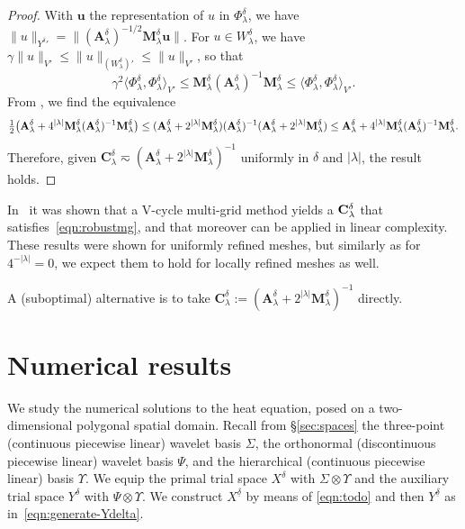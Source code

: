 \documentclass[11pt,a4paper,oneside,english]{amsart}
\numberwithin{equation}{section}
\numberwithin{theorem}{section}
\theoremstyle{definition}
\newcommand{\la}{\langle}
\newcommand{\ra}{\rangle}
\newcommand{\udelta}{{\underline{\delta}}}
\newcommand{\rvv}[1]{{\color{teal}{RvV: #1}}}
\begin{document}
\begin{proof}

  With $\mathbf u$ the representation of $u$ in $\Phi_\lambda^\delta$, we have
  $\|u\|_{{Y^\delta}'} = \|(\mathbf A_\lambda^\delta)^{-1/2} \mathbf M_\lambda^\delta \mathbf u\|$.
For $u \in W_\lambda^\delta$, we have $\gamma \|u\|_{V'} \leq \|u\|_{(W_\lambda^\delta)'} \leq \|u\|_{V'}$, so that
  \[
    \gamma^2 \la \Phi_\lambda^\delta, \Phi_\lambda^\delta \ra_{V'} \leq \mathbf M_\lambda^\delta (\mathbf A_\lambda^\delta)^{-1} \mathbf M_\lambda^\delta \leq \la \Phi_\lambda^\delta, \Phi_\lambda^\delta \ra_{V'}.
  \]
  From \cite[Thm.~4]{Pearson2012}, we find the equivalence
  \[
\tfrac12\big( {\bf A}_\lambda^\delta + 4^{|\lambda|} {\bf M}^\delta_\lambda ({\bf A}^\delta_\lambda)^{-1}  {\bf M}^\delta_\lambda\big)
\leq ({\bf A}_\lambda^\delta + 2^{|\lambda|}{\bf M}^\delta_\lambda) ({\bf A}_\lambda^\delta)^{-1} ({\bf A}_\lambda^\delta + 2^{|\lambda|}{\bf M}^\delta_\lambda)
\leq {\bf A}_\lambda^\delta + 4^{|\lambda|} {\bf M}^\delta_\lambda ({\bf A}^\delta_\lambda)^{-1}  {\bf M}^\delta_\lambda.
\]
Therefore, given $\mathbf C_\lambda^\delta \eqsim (\mathbf A_\lambda^\delta + 2^{|\lambda|} \mathbf M_\lambda^\delta)^{-1}$ uniformly in $\delta$ and $|\lambda|$, the result holds.
\end{proof}
In~\cite{olshanskii2000convergence, kolev2016multilevel} it was shown that a V-cycle multi-grid method yields a ${\bf C}^\delta_{\lambda}$ that satisfies~\eqref{eqn:robustmg}, and that moreover  can be applied in linear complexity.
These results were shown for uniformly refined meshes, but similarly as for $4^{-|\lambda|} = 0$, we expect them to hold for locally refined meshes as well. \rvv{Hier had Rob iets snuggers over te zeggen.}

 A (suboptimal) alternative is to take
$\mathbf C_\lambda^\delta := (\mathbf A_\lambda^\delta + 2^{|\lambda|} \mathbf M_\lambda^\delta)^{-1}$
directly.



\section{Numerical results}
We study the numerical solutions to the heat equation, posed on a two-dimensional
polygonal spatial domain. Recall from \S\ref{sec:spaces} the three-point (continuous piecewise linear)
wavelet basis $\Sigma$, the orthonormal (discontinuous piecewise linear)
wavelet basis $\Psi$, and the hierarchical (continuous piecewise linear) basis $\Upsilon$.
We equip the primal trial space $X^\delta$ with $\Sigma \otimes \Upsilon$ and
the auxiliary trial space $Y^\delta$ with $\Psi \otimes \Upsilon$. We construct
$X^\udelta$ by means of \eqref{eqn:todo} and then $Y^\udelta$ as in~\eqref{eqn:generate-Ydelta}.
\end{document}
